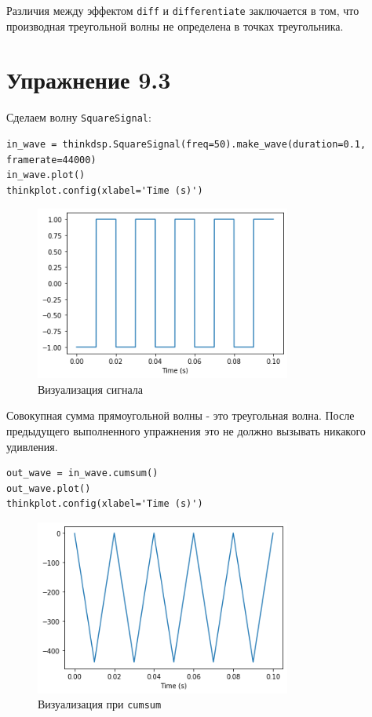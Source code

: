 \documentclass[a4paper,12pt]{report}
\begin{document}
Различия между эффектом \texttt{diff} и \texttt{differentiate} заключается в том, что производная треугольной волны не определена в точках треугольника.

\chapter{Упражнение 9.3}

Сделаем волну \texttt{SquareSignal}:

\begin{lstlisting}[caption=Создание сигнала]
in_wave = thinkdsp.SquareSignal(freq=50).make_wave(duration=0.1, framerate=44000)
in_wave.plot()
thinkplot.config(xlabel='Time (s)')
\end{lstlisting}

\begin{figure}[H]
        \centering
        \includegraphics[width=0.75\textwidth]{lab9_fig3_1.png}
        \caption{Визуализация сигнала}
        \label{fig:lab9_fig3_1}
\end{figure}

Совокупная сумма прямоугольной волны - это треугольная волна. После предыдущего выполненного упражнения это не должно вызывать никакого удивления.

\begin{lstlisting}[caption=Визуализация при \texttt{cumsum}]
out_wave = in_wave.cumsum()
out_wave.plot()
thinkplot.config(xlabel='Time (s)')
\end{lstlisting}

\begin{figure}[H]
        \centering
        \includegraphics[width=0.75\textwidth]{lab9_fig3_2.png}
        \caption{Визуализация при \texttt{cumsum}}
        \label{fig:lab9_fig3_2}
\end{figure}
\end{document}
